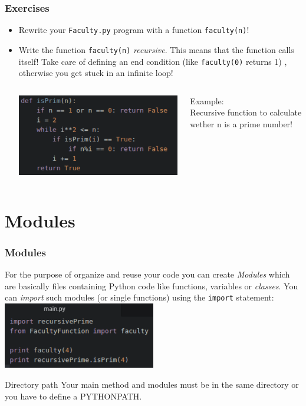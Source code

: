 \documentclass{beamer}
\begin{document}
\begin{frame}
\frametitle{Exercises}
	\begin{itemize}
		\item Rewrite your \texttt{Faculty.py} program with a function \texttt{faculty(n)}!
		\item Write the function \texttt{faculty(n)} \textit{recursive}. This means that the function calls itself! Take care of defining an end condition (like \texttt{faculty(0)} returns 1) , otherwise you get stuck in an infinite loop! \\
		\begin{columns}[T]
		\begin{column}[T]{6cm}
			\includegraphics[width = 1\textwidth]{recursivePrim.pdf}
		\end{column}
		\begin{column}[T]{4cm}
			Example: \\
			Recursive function to calculate wether n is a prime number! 
		\end{column}
		\end{columns}
	\end{itemize}
\end{frame}

\section{Modules}

\begin{frame}
\frametitle{Modules}
	For the purpose of organize and reuse your code you can create \textit{Modules} which are basically files containing Python code like functions, variables or \textit{classes}. You can \textit{import} such modules (or single functions) using the \texttt{import} statement:
	\includegraphics[width = 0.5\textwidth]{ImportStatements.pdf}
	\begin{alertblock}{Directory path}
		Your main method and modules must be in the same directory or you have to define a PYTHONPATH.
	\end{alertblock}
\end{frame}
	
\end{document}
